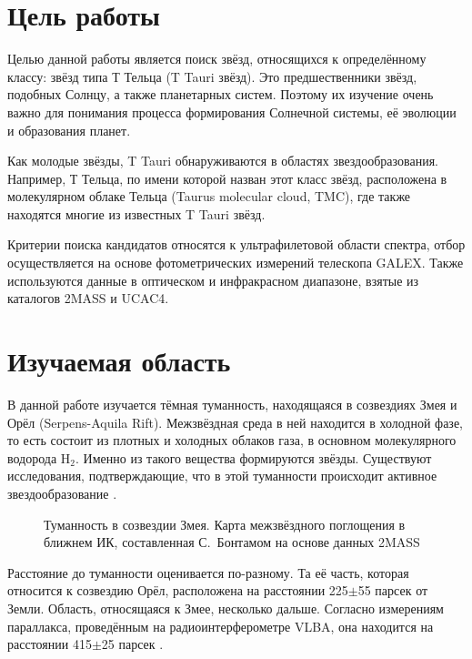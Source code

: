 

\section{Цель работы}
Целью данной работы является поиск звёзд, относящихся к определённому классу: звёзд типа Т Тельца (T Tauri звёзд).
Это предшественники звёзд, подобных Солнцу, а также планетарных систем. Поэтому их изучение очень важно для понимания процесса формирования Солнечной системы, её эволюции и образования планет. 

Как молодые звёзды, T Tauri обнаруживаются в областях звездообразования. Например, Т Тельца, по имени которой назван этот класс звёзд, расположена в молекулярном облаке Тельца (Taurus molecular cloud, TMC), где также находятся многие из известных T Tauri звёзд.

Критерии поиска кандидатов относятся к ультрафилетовой области спектра, отбор осуществляется на основе фотометрических измерений телескопа GALEX. Также используются данные в оптическом и инфракрасном диапазоне, взятые из каталогов 2MASS и UCAC4.

\section{Изучаемая область}

В данной работе изучается тёмная туманность, находящаяся в созвездиях Змея и Орёл (Serpens-Aquila Rift). Межзвёздная среда в ней находится в холодной фазе, то есть состоит из плотных и холодных облаков газа, в основном молекулярного водорода H$_{2}$. Именно из такого вещества формируются звёзды. Существуют исследования, подтверждающие, что в этой туманности происходит активное звездообразование \cite{park2012far}.

\begin{figure}[ht]
\hfill
\caption{Туманность в созвездии Змея. Карта межзвёздного поглощения в ближнем ИК, составленная С.~Бонтамом на основе данных 2MASS \cite{andreprobing}}
\label{fig:area}
\end{figure}


Расстояние до туманности оценивается по-разному. Та её часть, которая относится к созвездию Орёл, расположена на расстоянии 225$\pm$55 парсек от Земли. Область, относящаяся к Змее, несколько дальше. Согласно измерениям параллакса, проведённым на радиоинтерферометре VLBA, она находится на расстоянии 415$\pm$25 парсек \cite{park2012far}.

